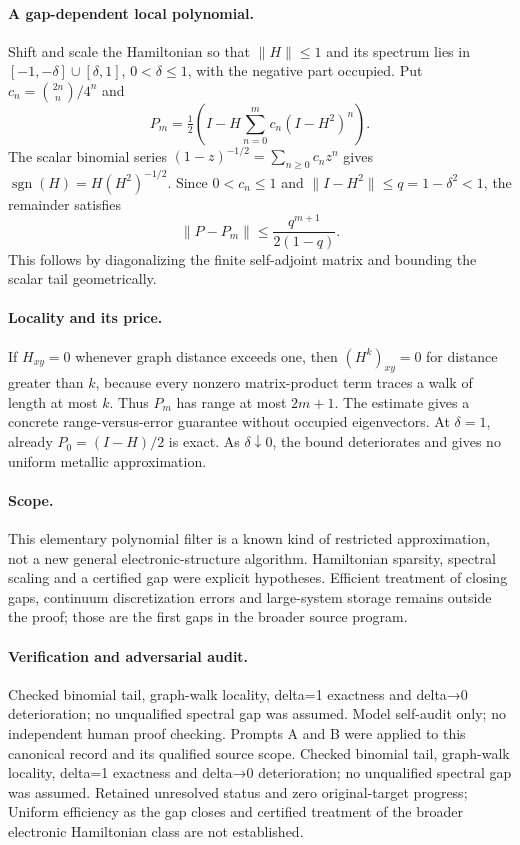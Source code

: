 \documentclass[11pt]{article}
\begin{document}
\paragraph{A gap-dependent local polynomial.} Shift and scale the Hamiltonian so that $\|H\|\leq1$ and its spectrum lies in $[-1,-\delta]\cup[\delta,1]$, $0<\delta\leq1$, with the negative part occupied. Put $c_n=\binom{2n}{n}/4^n$ and
\[
 P_m=\tfrac12\left(I-H\sum_{n=0}^m c_n(I-H^2)^n\right).
\]
The scalar binomial series $(1-z)^{-1/2}=\sum_{n\geq0}c_nz^n$ gives $\operatorname{sgn}(H)=H(H^2)^{-1/2}$. Since $0<c_n\leq1$ and $\|I-H^2\|\leq q=1-\delta^2<1$, the remainder satisfies
\[
 \|P-P_m\|\leq\frac{q^{m+1}}{2(1-q)}.
\]
This follows by diagonalizing the finite self-adjoint matrix and bounding the scalar tail geometrically.

\paragraph{Locality and its price.} If $H_{xy}=0$ whenever graph distance exceeds one, then $(H^k)_{xy}=0$ for distance greater than $k$, because every nonzero matrix-product term traces a walk of length at most $k$. Thus $P_m$ has range at most $2m+1$. The estimate gives a concrete range-versus-error guarantee without occupied eigenvectors. At $\delta=1$, already $P_0=(I-H)/2$ is exact. As $\delta\downarrow0$, the bound deteriorates and gives no uniform metallic approximation.

\paragraph{Scope.} This elementary polynomial filter is a known kind of restricted approximation, not a new general electronic-structure algorithm. Hamiltonian sparsity, spectral scaling and a certified gap were explicit hypotheses. Efficient treatment of closing gaps, continuum discretization errors and large-system storage remains outside the proof; those are the first gaps in the broader source program.

\paragraph{Verification and adversarial audit.}
Checked binomial tail, graph-walk locality, delta=1 exactness and delta→0 deterioration; no unqualified spectral gap was assumed. Model self-audit only; no independent human proof checking. Prompts A and B were applied to this canonical record and its qualified source scope. Checked binomial tail, graph-walk locality, delta=1 exactness and delta→0 deterioration; no unqualified spectral gap was assumed. Retained unresolved status and zero original-target progress; Uniform efficiency as the gap closes and certified treatment of the broader electronic Hamiltonian class are not established.
\end{document}
